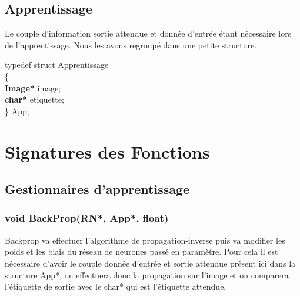 \documentclass{article}
\newcommand\tab[1][1cm]{\hspace*{#1}}
\begin{document}
	\subsection{Apprentissage}
	Le couple d'information sortie attendue et donnée d'entrée étant nécessaire lors de l'apprentissage. Nous les avons regroupé dans une petite structure.
	\begin{flushleft}
		typedef struct Apprentissage\\
			\{\\
				\tab \textcolor{myblue}{\textbf{Image*}} image;\\
				\tab \textcolor{myblue}{\textbf{char*}} etiquette;\\
			\} App;
	\end{flushleft}
	
	\newpage
	
	
	
	
	
	
\section{Signatures des Fonctions}
	\subsection{Gestionnaires d'apprentissage}
			\subsubsection{\textcolor{myblue}{\textbf{void}} BackProp(\textcolor{myblue}{\textbf{RN*}}, \textcolor{myblue}{\textbf{App*}}, \textcolor{myblue}{\textbf{float}})}
				Backprop va effectuer l'algorithme de propagation-inverse puis va modifier les poids et les biais du réseau de neurones passé en paramètre.
				Pour cela il est nécessaire d'avoir le couple donnée d'entrée et sortie attendue présent ici dans la structure App*, on effectuera donc la propagation sur l'image et on comparera l'étiquette de sortie avec le char* qui est l'étiquette attendue.
				
\end{document}
